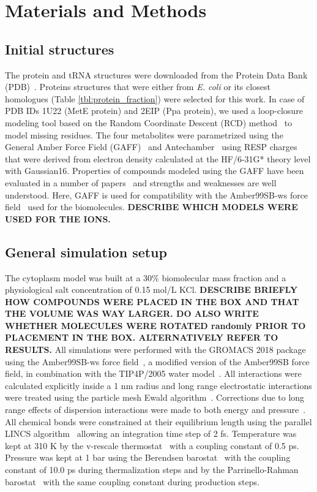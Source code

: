 \documentclass[journal=jcisd8,manuscript=article]{achemso}
\begin{document}
\section*{Materials and Methods}

\subsection{Initial structures}
The protein and tRNA structures were downloaded from the Protein Data
Bank (PDB)~\cite{pdb}. Proteins structures that were either from {\em
  E. coli} or its closest homologues (Table
\ref{tbl:protein_fraction}) were selected for this work. In case of
PDB IDs 1U22 (MetE protein) and 2EIP (Ppa protein), we used a
loop-closure modeling tool based on the Random Coordinate Descent
(RCD) method~\cite{Chys2013} to model missing residues. The four
metabolites were parametrized using the General Amber Force Field
(GAFF)~\cite{Wang2004a} and Antechamber~\cite{Wang2005b} using RESP
charges~\cite{Bayly1993a} that were derived from electron density
calculated at the HF/6-31G* theory level with Gaussian16.  Properties
of compounds modeled using the GAFF have been evaluated in a number of
papers~\cite{Caleman2012a,sprenger2015general,Fischer2015a,JZhang2015a,JZhang2015,Spoel2018a}
and strengths and weaknesses are well understood. Here, GAFF is used
for compatibility with the Amber99SB-ws force field~\cite{Best2014a}
used for the biomolecules. {\bf DESCRIBE WHICH MODELS WERE USED FOR
  THE IONS.}
 
\subsection{General simulation setup}
The cytoplasm model was built at a 30\% biomolecular mass fraction and
a physiological salt concentration of 0.15 mol/L KCl.  {\bf DESCRIBE
  BRIEFLY HOW COMPOUNDS WERE PLACED IN THE BOX AND THAT THE VOLUME WAS
  WAY LARGER. DO ALSO WRITE WHETHER MOLECULES WERE ROTATED randomly
  PRIOR TO PLACEMENT IN THE BOX. ALTERNATIVELY REFER TO RESULTS.}  All
simulations were performed with the GROMACS 2018
package~\cite{Abraham2015a,Pronk2013a} using the Amber99SB-ws force
field~\cite{Best2014a}, a modified version of the Amber99SB force
field, in combination with the TIP4P/2005 water
model~\cite{Abascal2005b}. All interactions were calculated explicitly
inside a 1 nm radius and long range electrostatic interactions were
treated using the particle mesh Ewald
algorithm~\cite{Essmann1995a}. Corrections due to long range effects
of dispersion interactions were made to both energy and
pressure~\cite{Allen1987a}. All chemical bonds were constrained at
their equilibrium length using the parallel LINCS
algorithm~\cite{Hess1997a,Hess2008b} allowing an integration time step
of 2 fs. Temperature was kept at 310 K by the v-rescale
thermostat~\cite{Bussi2007a} with a coupling constant of 0.5
ps. Pressure was kept at 1 bar using the Berendsen
barostat~\cite{Berendsen1984a} with the coupling constant of 10.0 ps
during thermalization steps and by the Parrinello-Rahman
barostat~\cite{Parrinello1981a} with the same coupling constant during
production steps.
\end{document}

